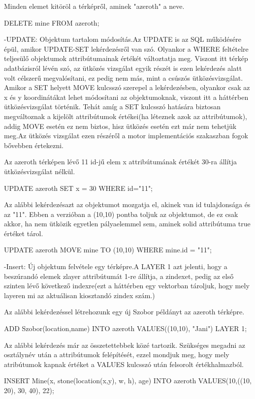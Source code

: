 \begin{sql}
Minden elemet kitöröl a térképről, aminek "azeroth" a neve.
\begin{sql}
DELETE mine FROM azeroth;
\end{sql}


-UPDATE:
Objektum tartalom módosítás.Az UPDATE is az SQL működésére épül, amikor UPDATE-SET lekérdezésről van szó. Olyankor a WHERE feltételre teljesülő objektumok attribútumainak értékét változtatja meg. Viszont itt térkép adatbázisról lévén szó, az ütközés vizsgálat egyik részét is ezen lekérdezés alatt volt célszerű megvalósítani, ez pedig nem más, mint a csúszós ütközésvizsgálat. Amikor a SET helyett MOVE kulcsszó szerepel a lekérdezésben, olyankor csak az x és y koordinátákat lehet módosítani az objektumoknak, viszont itt a háttérben ütközésvizsgálat történik. 
Tehát amíg a SET kulcsszó hatására biztosan megváltoznak a kijelölt attribútumok értékei(ha léteznek azok az attribútumok), addig MOVE esetén ez nem biztos, hisz ütközés esetén ezt már nem tehetjük meg.Az ütközés vizsgálat ezen részéről a motor implementációs szakaszban fogok bővebben értekezni.



Az azeroth térképen lévő 11 id-jű elem x attribútumának értékét 30-ra állítja ütközésvizsgálat nélkül.
\begin{sql}
UPDATE azeroth SET x = 30 WHERE id="11";
\end{sql}

Az alábbi lekérdezésazt az objektumot mozgatja el, akinek van id tulajdonsága és az "11". Ebben a verzióban a (10,10) pontba toljuk az objektumot, de ez csak akkor, ha nem ütközik egyetlen pályaelemmel sem, aminek solid attribútuma true értéket tárol.
\begin{sql}
UPDATE azeroth MOVE mine TO (10,10) WHERE mine.id = "11";
\end{sql}


-Insert:
Új objektum felvétele egy térképre.A LAYER 1 azt jelenti, hogy a beszúrandó elemek zlayer attribútumát 1-re állítja, a zindexet, pedig az első szinten lévő következő indexre(ezt a háttérben egy vektorban tároljuk, hogy mely layeren mi az aktuálisan kiosztandó zindex szám.)

Az alábbi lekérdezéssel létrehozunk egy új Szobor példányt az azeroth térképre.
\begin{sql}
ADD Szobor(location,name) INTO azeroth VALUES((10,10), "Jani") LAYER 1;
\end{sql}

Az alábbi lekérdezés már az összetettebbek közé tartozik. Szükséges megadni az osztálynév után a attribútumok felépítését, ezzel mondjuk meg, hogy mely atribútumok kapnak értéket a VALUES kulcsszó után felsorolt értékhalmazból.
\begin{sql}
INSERT Mine(x, stone(location(x,y), w, h), age) INTO azeroth VALUES(10,((10, 20), 30, 40), 22);
\end{sql}



\end{sql}
